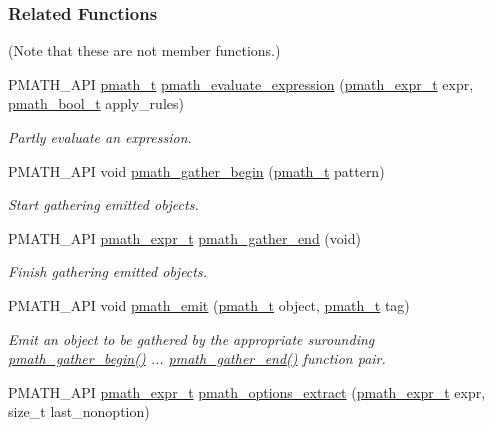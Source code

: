 \subsubsection*{Related Functions}
(Note that these are not member functions.) \begin{CompactItemize}
\item 
PMATH\_\-API \hyperlink{classpmath__t}{pmath\_\-t} \hyperlink{classpmath__expr__t_d723e196e3d7f9078729bc0fb2fe7eed}{pmath\_\-evaluate\_\-expression} (\hyperlink{classpmath__expr__t}{pmath\_\-expr\_\-t} expr, \hyperlink{group__general__types_gc92090cb0b56345d6c379ed2341d4ef4}{pmath\_\-bool\_\-t} apply\_\-rules)
\begin{CompactList}\small\item\em Partly evaluate an expression. \item\end{CompactList}\item 
PMATH\_\-API void \hyperlink{group__helpers_g077f3730ca4275b87d9a35bce6013e45}{pmath\_\-gather\_\-begin} (\hyperlink{classpmath__t}{pmath\_\-t} pattern)
\begin{CompactList}\small\item\em Start gathering emitted objects. \item\end{CompactList}\item 
PMATH\_\-API \hyperlink{classpmath__expr__t}{pmath\_\-expr\_\-t} \hyperlink{group__helpers_ga2f732b35703986263e3a15592b4a46e}{pmath\_\-gather\_\-end} (void)
\begin{CompactList}\small\item\em Finish gathering emitted objects. \item\end{CompactList}\item 
PMATH\_\-API void \hyperlink{group__helpers_ga06135012f4d2a0faf696c0cd1111075}{pmath\_\-emit} (\hyperlink{classpmath__t}{pmath\_\-t} object, \hyperlink{classpmath__t}{pmath\_\-t} tag)
\begin{CompactList}\small\item\em Emit an object to be gathered by the appropriate surounding \hyperlink{group__helpers_g077f3730ca4275b87d9a35bce6013e45}{pmath\_\-gather\_\-begin()} ... \hyperlink{group__helpers_ga2f732b35703986263e3a15592b4a46e}{pmath\_\-gather\_\-end()} function pair. \item\end{CompactList}\item 
PMATH\_\-API \hyperlink{classpmath__expr__t}{pmath\_\-expr\_\-t} \hyperlink{group__helpers_g24403dfbd825b17fc4c6da5973922184}{pmath\_\-options\_\-extract} (\hyperlink{classpmath__expr__t}{pmath\_\-expr\_\-t} expr, size\_\-t last\_\-nonoption)

\end{CompactItemize}
